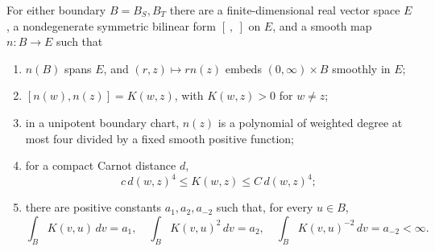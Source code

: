 \begin{lemma}
\label{lem:locality-kernel}
For either boundary $B=B_S,B_T$ there are a finite-dimensional real
vector space $E$, a nondegenerate symmetric bilinear form $[\ ,\ ]$ on
$E$, and a smooth map $n:B\longrightarrow E$ such that
\begin{enumerate}[label=(\roman*)]
\item $n(B)$ spans $E$, and $(r,z)\mapsto r n(z)$ embeds
$(0,\infty)\times B$ smoothly in $E$;
\item $[n(w),n(z)]=K(w,z)$, with $K(w,z)>0$ for $w\ne z$;
\item in a unipotent boundary chart, $n(z)$ is a polynomial of weighted
degree at most four divided by a fixed smooth positive function;
\item for a compact Carnot distance $d$,
\[
 c\,d(w,z)^4\le K(w,z)\le C\,d(w,z)^4;
\]
\item there are positive constants $a_1,a_2,a_{-2}$ such that, for every
$u\in B$,
\[
 \int_B K(v,u)\,dv=a_1,
 \quad \int_B K(v,u)^2\,dv=a_2,
 \quad \int_B K(v,u)^{-2}\,dv=a_{-2}<\infty.
\]
\end{enumerate}
\end{lemma}

